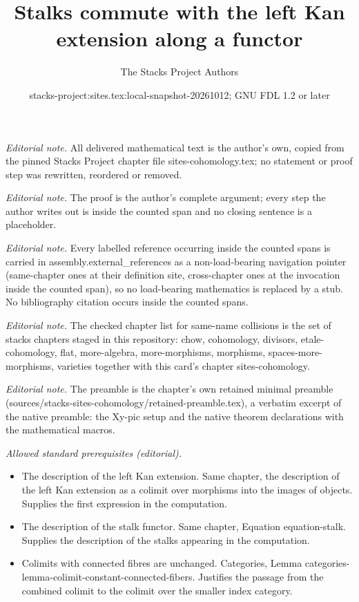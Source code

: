 \documentclass[10pt,a4paper]{amsart}
\title{Stalks commute with the left Kan extension along a functor}
\author{The Stacks Project Authors}
\date{stacks-project:sites.tex:local-snapshot-20261012; GNU FDL 1.2 or later}
\theoremstyle{plain}
\theoremstyle{definition}
\theoremstyle{remark}
\numberwithin{equation}{subsection}
\begin{document}
\maketitle
\noindent\textit{Editorial note.} All delivered mathematical text is the author's own, copied from the pinned Stacks Project chapter file sites-cohomology.tex; no statement or proof step was rewritten, reordered or removed.\par\medskip
\noindent\textit{Editorial note.} The proof is the author's complete argument; every step the author writes out is inside the counted span and no closing sentence is a placeholder.\par\medskip
\noindent\textit{Editorial note.} Every labelled reference occurring inside the counted spans is carried in assembly.external\_references as a non-load-bearing navigation pointer (same-chapter ones at their definition site, cross-chapter ones at the invocation inside the counted span), so no load-bearing mathematics is replaced by a stub. No bibliography citation occurs inside the counted spans.\par\medskip
\noindent\textit{Editorial note.} The checked chapter list for same-name collisions is the set of stacks chapters staged in this repository: chow, cohomology, divisors, etale-cohomology, flat, more-algebra, more-morphisms, morphisms, spaces-more-morphisms, varieties together with this card's chapter sites-cohomology.\par\medskip
\noindent\textit{Editorial note.} The preamble is the chapter's own retained minimal preamble (sources/stacks-sites-cohomology/retained-preamble.tex), a verbatim excerpt of the native preamble: the Xy-pic setup and the native theorem declarations with the mathematical macros.\par\medskip
\noindent\textit{Allowed standard prerequisites (editorial).}\begin{itemize}
\item The description of the left Kan extension. Same chapter, the description of the left Kan extension as a colimit over morphisms into the images of objects. Supplies the first expression in the computation.
\item The description of the stalk functor. Same chapter, Equation equation-stalk. Supplies the description of the stalks appearing in the computation.
\item Colimits with connected fibres are unchanged. Categories, Lemma categories-lemma-colimit-constant-connected-fibers. Justifies the passage from the combined colimit to the colimit over the smaller index category.
\end{itemize}\medskip
\end{document}
